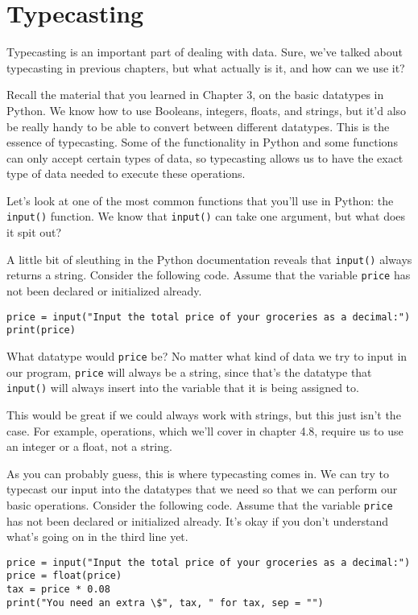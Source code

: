 \section{Typecasting}
Typecasting is an important part of dealing with data. Sure, we've talked about typecasting in previous chapters, but what actually is it, and how can we use it?\par
Recall the material that you learned in Chapter 3, on the basic datatypes in Python. We know how to use Booleans, integers, floats, and strings, but it'd also be really handy to be able to convert between different datatypes. This is the essence of typecasting. Some of the functionality in Python and some functions can only accept certain types of data, so typecasting allows us to have the exact type of data needed to execute these operations.\par
Let's look at one of the most common functions that you'll use in Python: the \verb|input()| function. We know that \verb|input()| can take one argument, but what does it spit out?\par
A little bit of sleuthing in the Python documentation reveals that \verb|input()| always returns a string. Consider the following code. Assume that the variable \verb|price| has not been declared or initialized already.
\begin{lstlisting}[style=pippython]
price = input("Input the total price of your groceries as a decimal:")
print(price)
\end{lstlisting}
What datatype would \verb|price| be? No matter what kind of data we try to input in our program, \verb|price| will always be a string, since that's the datatype that \verb|input()| will always insert into the variable that it is being assigned to.\par
This would be great if we could always work with strings, but this just isn't the case. For example,  operations, which we'll cover in chapter 4.8, require us to use an integer or a float, not a string.\par
As you can probably guess, this is where typecasting comes in. We can try to typecast our input into the datatypes that we need so that we can perform our basic  operations. Consider the following code. Assume that the variable \verb|price| has not been declared or initialized already. It's okay if you don't understand what's going on in the third line yet.\par
\begin{lstlisting}[style=pippython]
price = input("Input the total price of your groceries as a decimal:")
price = float(price)
tax = price * 0.08
print("You need an extra \$", tax, " for tax, sep = "")
\end{lstlisting}
